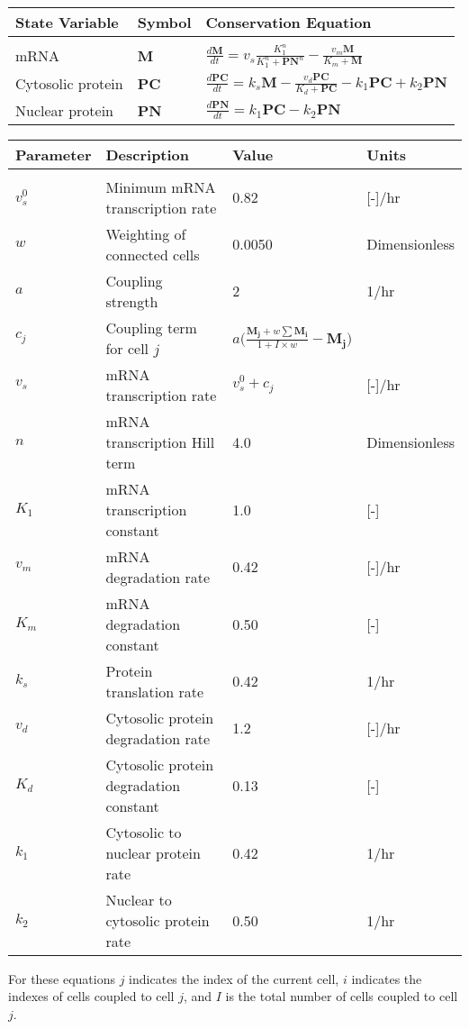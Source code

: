 


\begin{table*}[p]
    \caption{Ordinary differential equations and parameters comprising the 3-state circadian model [35,36].}
\label{tab:3st}
\begin{center}
{
\begin{tabular}{l l l}\hline
	State Variable & Symbol & Conservation Equation\\
	\hline\\
	mRNA & \textbf{M} & $\displaystyle\frac{d\mathbf{M}}{dt} = 
	v_s\frac{K_1^n}{K_1^n + \mathbf{PN}^n} 
	- \frac{v_m\mathbf{M}}{K_m+\mathbf{M}}
	$\\[0.6cm]
	Cytosolic protein & \textbf{PC} & $\displaystyle\frac{d\mathbf{PC}}{dt} 
	= k_s\mathbf{M} - \frac{v_d\mathbf{PC}}{K_d + \mathbf{PC}} 
	- k_1\mathbf{PC} + k_2\mathbf{PN}
	$\\[0.6cm]
	Nuclear protein & \textbf{PN} & $\displaystyle\frac{d\mathbf{PN}}{dt} 
	= k_1\mathbf{PC} - k_2\mathbf{PN}
	$\\[0.6cm]
    \hline
\end{tabular}
\begin{tabular}{l l l l}\hline
	Parameter & Description & Value & Units\\
	\hline\\
	$v_s^0$ & Minimum mRNA transcription rate & 0.82 & [-]/hr\\
	$w$ & Weighting of connected cells & 0.0050 & Dimensionless \\
	$a$ & Coupling strength & 2 & 1/hr\\
	$c_j$ & Coupling term for cell $j$ &  
	$a\bigg(\frac{\mathbf{M_j} + w\sum \mathbf{M_i}}{1+
	I\times w} -\mathbf{M_j}\bigg)$\\
	$v_s$ & mRNA transcription rate & $\displaystyle v_s^0 + c_j$ 
	& [-]/hr \\
	$n$ & mRNA transcription Hill term & 4.0 & Dimensionless\\
	$K_1$ & mRNA transcription constant & 1.0 & [-]\\
	$v_m$ & mRNA degradation rate & 0.42 & [-]/hr\\
	$K_m$ & mRNA degradation constant & 0.50 & [-]\\
	$k_s$ & Protein translation rate & 0.42 & 1/hr\\
	$v_d$ & Cytosolic protein degradation rate & 1.2 & [-]/hr\\
	$K_d$ & Cytosolic protein degradation constant & 0.13 & [-]\\
	$k_1$ & Cytosolic to nuclear protein rate & 0.42  & 1/hr\\
	$k_2$ & Nuclear to cytosolic protein rate & 0.50 & 1/hr\\
	\hline
\end{tabular}
}
\vspace{0.5cm}
For these equations $j$ indicates the index of the current cell, $i$ indicates the indexes of cells coupled to cell $j$, and $I$ is the total number of cells coupled to cell $j$.
\end{center}
\end{table*}

